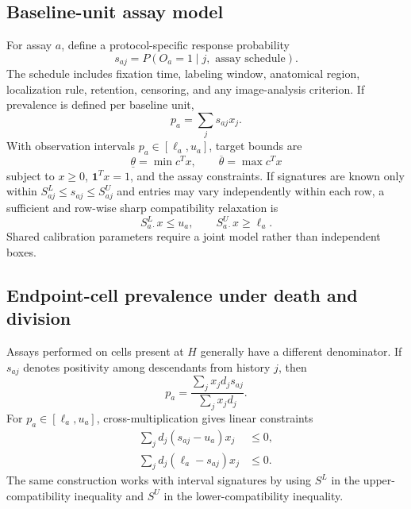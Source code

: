 \documentclass[11pt]{article}
\begin{document}
\subsection{Baseline-unit assay model}
For assay $a$, define a protocol-specific response probability
\begin{equation}
s_{aj}=P(O_a=1\mid j,\text{ assay schedule}).
\end{equation}
The schedule includes fixation time, labeling window, anatomical region, localization rule, retention, censoring, and any image-analysis criterion. If prevalence is defined per baseline unit,
\begin{equation}
p_a=\sum_js_{aj}x_j.
\label{eq:baseline}
\end{equation}
With observation intervals $p_a\in[\ell_a,u_a]$, target bounds are
\begin{equation}
\underline\theta=\min c^Tx,\qquad \overline\theta=\max c^Tx
\label{eq:lp}
\end{equation}
subject to $x\ge0$, $\mathbf1^Tx=1$, and the assay constraints. If signatures are known only within $S^L_{aj}\le s_{aj}\le S^U_{aj}$ and entries may vary independently within each row, a sufficient and row-wise sharp compatibility relaxation is
\begin{equation}
S^L_{a\cdot}x\le u_a,\qquad S^U_{a\cdot}x\ge\ell_a.
\label{eq:intervalS}
\end{equation}
Shared calibration parameters require a joint model rather than independent boxes.

\subsection{Endpoint-cell prevalence under death and division}
Assays performed on cells present at $H$ generally have a different denominator. If $s_{aj}$ denotes positivity among descendants from history $j$, then
\begin{equation}
p_a=\frac{\sum_jx_jd_js_{aj}}{\sum_jx_jd_j}.
\label{eq:endpoint}
\end{equation}
For $p_a\in[\ell_a,u_a]$, cross-multiplication gives linear constraints
\begin{align}
\sum_jd_j(s_{aj}-u_a)x_j&\le0,\\
\sum_jd_j(\ell_a-s_{aj})x_j&\le0.
\end{align}
The same construction works with interval signatures by using $S^L$ in the upper-compatibility inequality and $S^U$ in the lower-compatibility inequality.
\end{document}
